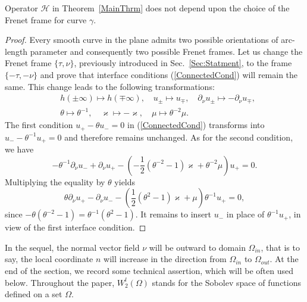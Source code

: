 \documentclass[graybox]{svmult}
\renewcommand{\kappa}{\varkappa}
\newcommand{\eqref}[1]{(\ref{#1})}
\begin{document}
\begin{proposition}\label{PropInvarianceOfCnds}
  Operator $\mathcal{H}$ in Theorem~\ref{MainThrm} does not depend upon the choice of the Frenet frame for curve $\gamma$.
\end{proposition}
\begin{proof}
  Every smooth curve in the plane admits two possible orientations of arc-length parameter and consequently two possible  Frenet frames. Let us change the Frenet frame $\{\tau, \nu\}$, previously introduced in Sec.~\ref{Sec:Statment}, to the frame $\{-\tau, -\nu\}$ and prove that
interface conditions \eqref{ConnectedCond} will remain the same. This change leads to the following transformations:
\begin{eqnarray}\nonumber
&h(\pm\infty)\mapsto h(\mp\infty), \quad u_\pm\mapsto u_\mp, \quad \partial_\nu u_\pm \mapsto -\partial_\nu u_\mp,\\\nonumber
& \theta\mapsto \theta^{-1}, \quad \kappa\mapsto -\kappa,\quad \mu\mapsto \theta^{-2}\mu.
\end{eqnarray}
The first condition $u_+-\theta u_-=0$ in \eqref{ConnectedCond} transforms into $u_--\theta^{-1} u_+=0$ and therefore remains unchanged. As for the second condition, we have
$$
 -\theta^{-1}\partial_\nu u_-+\partial_\nu u_+
-\left(-\textstyle\frac{1}{2 }(\theta^{-2}-1)\kappa+\theta^{-2}\mu\right) u_+=0.
$$
Multiplying the equality by $\theta$  yields
$$
\theta\partial_\nu u_+-\partial_\nu u_-
-\left(\textstyle\frac{1}{2 }(\theta^{2}-1)\kappa+\mu\right) \theta^{-1} u_+=0,
$$
since $-\theta(\theta^{-2}-1)=\theta^{-1}(\theta^{2}-1)$. It remains to insert $u_-$ in place of $\theta^{-1} u_+$, in view of the first interface condition.
\end{proof}

In the sequel, the normal vector field $\nu$ will be outward to domain $\Omega_{in}$, that is to say, the local coordinate $n$ will increase in the direction from $\Omega_{in}$ to $\Omega_{out}$.
At the end of the section,  we record some technical assertion, which  will be often used below.
Throughout the paper, $W_2^l(\Omega)$ stands for the Sobolev space of functions defined on a set $\Omega$.
\end{document}
